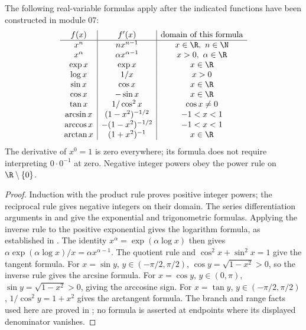 \begin{proposition}
The following real-variable formulas apply after the indicated functions have been constructed in module 07:
\[
\begin{array}{c|c|c}
 f(x)&f'(x)&\text{domain of this formula}\\\hline
 x^n&nx^{n-1}&x\in\R,\ n\in\N\\
 x^\alpha&\alpha x^{\alpha-1}&x>0,\ \alpha\in\R\\
 \exp x&\exp x&x\in\R\\
 \log x&1/x&x>0\\
 \sin x&\cos x&x\in\R\\
 \cos x&-\sin x&x\in\R\\
 \tan x&1/\cos^2x&\cos x\ne0\\
 \arcsin x&(1-x^2)^{-1/2}&-1<x<1\\
 \arccos x&-(1-x^2)^{-1/2}&-1<x<1\\
 \arctan x&(1+x^2)^{-1}&x\in\R
\end{array}
\]
The derivative of $x^0=1$ is zero everywhere; its formula does not require interpreting $0\cdot0^{-1}$ at zero. Negative integer powers obey the power rule on $\R\setminus\{0\}$.
\end{proposition}
\begin{proof}
Induction with the product rule proves positive integer powers; the reciprocal rule gives negative integers on their domain. The series differentiation arguments in  and  give the exponential and trigonometric formulas. Applying the inverse rule to the positive exponential gives the logarithm formula, as established in . The identity $x^\alpha=\exp(\alpha\log x)$ then gives $\alpha\exp(\alpha\log x)/x=\alpha x^{\alpha-1}$. The quotient rule and $\cos^2x+\sin^2x=1$ give the tangent formula. For $x=\sin y$, $y\in(-\pi/2,\pi/2)$, $\cos y=\sqrt{1-x^2}>0$, so the inverse rule gives the arcsine formula. For $x=\cos y$, $y\in(0,\pi)$, $\sin y=\sqrt{1-x^2}>0$, giving the arccosine sign. For $x=\tan y$, $y\in(-\pi/2,\pi/2)$, $1/\cos^2y=1+x^2$ gives the arctangent formula. The branch and range facts used here are proved in ; no formula is asserted at endpoints where its displayed denominator vanishes.
\end{proof}

